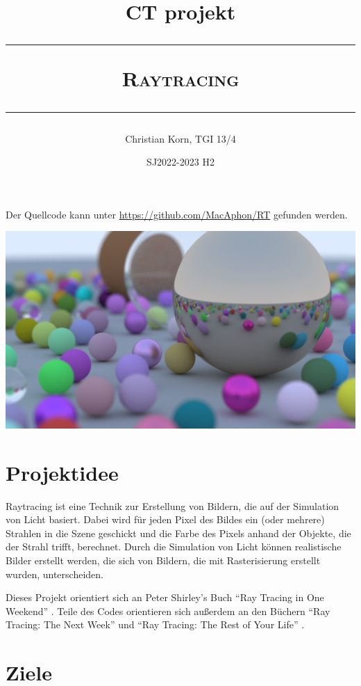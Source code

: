 \documentclass[a4paper, 10pt]{article}
\title{
    \vspace{-2em}
    \Large CT projekt \\
    \rule{\linewidth}{1pt}
    \textsc{
    \huge Raytracing \\
    }
    \rule{\linewidth}{1pt}
}
\author{Christian Korn, TGI 13/4}
\date{SJ2022-2023 H2} %
\begin{document}


\maketitle

\begin{center}
    Der Quellcode kann unter 
    \href{https://github.com/MacAphon/RT}{https://github.com/MacAphon/RT} gefunden werden. 
\end{center}



\includegraphics[scale=0.2]{images/large_scene.png}

\section{Projektidee}

Raytracing ist eine Technik zur Erstellung von Bildern, die auf der Simulation von Licht basiert.
Dabei wird für jeden Pixel des Bildes ein (oder mehrere) Strahlen in die Szene geschickt und die Farbe des Pixels anhand der Objekte, die der Strahl trifft, berechnet.
Durch die Simulation von Licht können realistische Bilder erstellt werden, die sich von Bildern, die mit Rasterisierung erstellt wurden, unterscheiden.

Dieses Projekt orientiert sich an Peter Shirley's Buch \enquote{Ray Tracing in One Weekend} \cite{Shirley2020RTW1}.
Teile des Codes orientieren sich außerdem an den Büchern \enquote{Ray Tracing: The Next Week} \cite{Shirley2020RTW2} und \enquote{Ray Tracing: The Rest of Your Life} \cite{Shirley2020RTW3}.

\section{Ziele}
\end{document}

